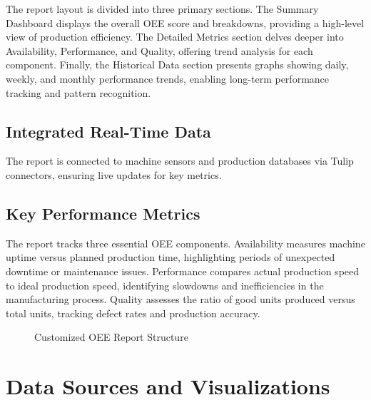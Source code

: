 \documentclass[a4paper,12pt]{article}
\begin{document}
The report layout is divided into three primary sections. The Summary Dashboard displays the overall OEE score and breakdowns, providing a high-level view of production efficiency. The Detailed Metrics section delves deeper into Availability, Performance, and Quality, offering trend analysis for each component. Finally, the Historical Data section presents graphs showing daily, weekly, and monthly performance trends, enabling long-term performance tracking and pattern recognition.

\subsection{Integrated Real-Time Data}

The report is connected to machine sensors and production databases via Tulip connectors, ensuring live updates for key metrics.

\subsection{Key Performance Metrics}

The report tracks three essential OEE components. Availability measures machine uptime versus planned production time, highlighting periods of unexpected downtime or maintenance issues. Performance compares actual production speed to ideal production speed, identifying slowdowns and inefficiencies in the manufacturing process. Quality assesses the ratio of good units produced versus total units, tracking defect rates and production accuracy.

\begin{figure}[H]
    \centering
    \caption{Customized OEE Report Structure}
\end{figure}

\section{Data Sources and Visualizations}
\end{document}
